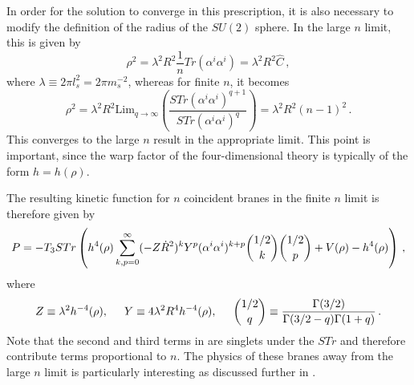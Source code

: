 In order for the solution to converge in this prescription, 
it is also necessary to modify the definition of the radius of the 
$SU(2)$ sphere. In the large $n$ limit, this is given by
% 
\begin{equation}
\rho^2 = \lambda^2 R^2 \frac{1}{n} Tr(\alpha^i \alpha^i) = \lambda^2 R^2
\hat{C} \,,
\end{equation}
% 
where $\lambda \equiv 2\pi l_s^2 = 2\pi m_s^{-2}$, 
whereas for finite $n$, it becomes
% 
\begin{equation}
\rho^2 = \lambda^2 R^2 \mathrm{Lim}_{q \to \infty} \left(\frac{STr (\alpha^i
\alpha^i)^{q+1}}{STr(\alpha^i \alpha^i)^q} \right) 
= \lambda^2 R^2 (n-1)^2 \,.
\end{equation}
% 
This converges to the large $n$ result in the appropriate limit.
This point is important, since the warp factor 
of the four-dimensional theory is typically of the form $h= h(\rho)$.


The resulting kinetic function for $n$ coincident branes in 
the finite $n$ limit is therefore given by
% 
\begin{equation}
\label{eq:genP-multi}
P = -T_3 STr \left(h^4(\rho) \sum_{k,p=0}^{\infty}(-Z\dot{R}^2)^k Y^p (\alpha^i
\alpha^i)^{k+p}{1/2 \choose k} {1/2 \choose p} + V(\rho)
-
h^4(\rho) \right) \,,
\end{equation}
% 
where 
% 
\begin{equation}
Z \equiv \lambda^2 h^{-4}(\rho), \hspace{0.5cm} Y \equiv 4\lambda^2 R^4
h^{-4}(\rho),
\hspace{0.5cm} {1/2 \choose q}
\equiv \frac{\Gamma(3/2)}{\Gamma(3/2-q)\Gamma(1+q)} \,.
\end{equation}
% 
Note that the second and third terms in  
are singlets under the $STr$ and therefore contribute terms proportional 
to $n$. The physics of these branes away from the large $n$ limit is particularly interesting as
discussed further
in \cite{thomasward, Ward:2007gs}.


